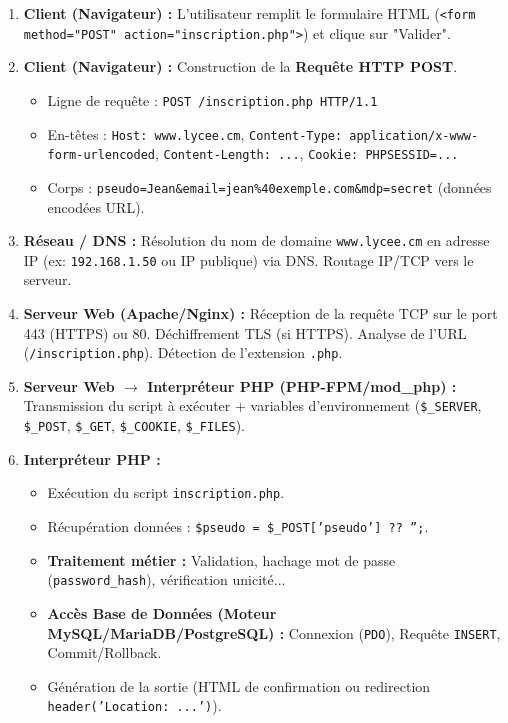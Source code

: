 \documentclass[11pt]{article}
\begin{document}
\begin{corrige}
\begin{enumerate}
    \item \textbf{Client (Navigateur) :} L'utilisateur remplit le formulaire HTML (\texttt{<form method="POST" action="inscription.php">}) et clique sur "Valider".
    \item \textbf{Client (Navigateur) :} Construction de la \textbf{Requête HTTP POST}.
    \begin{itemize}
        \item Ligne de requête : \texttt{POST /inscription.php HTTP/1.1}
        \item En-têtes : \texttt{Host: www.lycee.cm}, \texttt{Content-Type: application/x-www-form-urlencoded}, \texttt{Content-Length: ...}, \texttt{Cookie: PHPSESSID=...}
        \item Corps : \texttt{pseudo=Jean\&email=jean\%40exemple.com\&mdp=secret} (données encodées URL).
    \end{itemize}
    \item \textbf{Réseau / DNS :} Résolution du nom de domaine \texttt{www.lycee.cm} en adresse IP (ex: \texttt{192.168.1.50} ou IP publique) via DNS. Routage IP/TCP vers le serveur.
    \item \textbf{Serveur Web (Apache/Nginx) :} Réception de la requête TCP sur le port 443 (HTTPS) ou 80. Déchiffrement TLS (si HTTPS). Analyse de l'URL (\texttt{/inscription.php}). Détection de l'extension \texttt{.php}.
    \item \textbf{Serveur Web $\rightarrow$ Interpréteur PHP (PHP-FPM/mod\_php) :} Transmission du script à exécuter + variables d'environnement (\texttt{\$\_SERVER}, \texttt{\$\_POST}, \texttt{\$\_GET}, \texttt{\$\_COOKIE}, \texttt{\$\_FILES}).
    \item \textbf{Interpréteur PHP :} 
    \begin{itemize}
        \item Exécution du script \texttt{inscription.php}.
        \item Récupération données : \texttt{\$pseudo = \$\_POST['pseudo'] ?? '';}.
        \item \textbf{Traitement métier :} Validation, hachage mot de passe (\texttt{password\_hash}), vérification unicité...
        \item \textbf{Accès Base de Données (Moteur MySQL/MariaDB/PostgreSQL) :} Connexion (\texttt{PDO}), Requête \texttt{INSERT}, Commit/Rollback.
        \item Génération de la sortie (HTML de confirmation ou redirection \texttt{header('Location: ...')}).

\end{itemize}
\end{enumerate}
\end{corrige}
\end{document}
